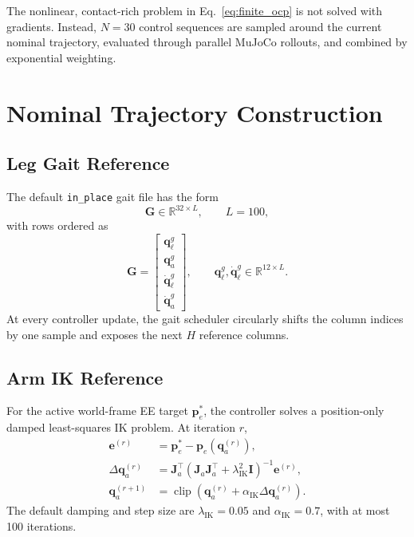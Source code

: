 \documentclass[11pt,a4paper]{article}
\newcommand{\R}{\mathbb{R}}
\newcommand{\clip}{\operatorname{clip}}
\newcommand{\code}[1]{\texttt{#1}}
\begin{document}
The nonlinear, contact-rich problem in Eq.~\eqref{eq:finite_ocp} is not solved
with gradients. Instead, $N=30$ control sequences are sampled around the
current nominal trajectory, evaluated through parallel MuJoCo rollouts, and
combined by exponential weighting.

\section{Nominal Trajectory Construction}

\subsection{Leg Gait Reference}

The default \code{in\_place} gait file has the form
\begin{equation}
  \bm{G}\in\R^{32\times L},\qquad L=100,
\end{equation}
with rows ordered as
\begin{equation}
  \bm{G}=
  \begin{bmatrix}
    \bm{q}_{\ell}^{g}\\
    \bm{q}_{a}^{g}\\
    \dot{\bm{q}}_{\ell}^{g}\\
    \dot{\bm{q}}_{a}^{g}
  \end{bmatrix},
  \qquad
  \bm{q}_{\ell}^{g},\dot{\bm{q}}_{\ell}^{g}\in\R^{12\times L}.
\end{equation}
At every controller update, the gait scheduler circularly shifts the column
indices by one sample and exposes the next $H$ reference columns.

\subsection{Arm IK Reference}

For the active world-frame EE target $\bm{p}_e^*$, the controller solves a
position-only damped least-squares IK problem. At iteration $r$,
\begin{align}
  \bm{e}^{(r)}
  &=\bm{p}_e^*-\bm{p}_e(\bm{q}_a^{(r)}),\\
  \Delta\bm{q}_a^{(r)}
  &=\bm{J}_a^\top
  \left(\bm{J}_a\bm{J}_a^\top+\lambda_{\mathrm{IK}}^2\bm{I}\right)^{-1}
  \bm{e}^{(r)},\\
  \bm{q}_a^{(r+1)}
  &=\clip\left(
  \bm{q}_a^{(r)}+\alpha_{\mathrm{IK}}\Delta\bm{q}_a^{(r)}
  \right).
\end{align}
The default damping and step size are
$\lambda_{\mathrm{IK}}=0.05$ and $\alpha_{\mathrm{IK}}=0.7$, with at most 100
iterations.
\end{document}
